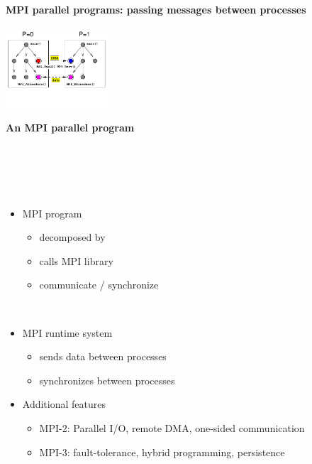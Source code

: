 \begin{frame}[fragile,label=ss-charm] 
\secframetitle{\ssCharm}
\framesubtitle{MPI parallel programs: passing messages between processes}
\begin{minipage}[t]{1.75in}
\begin{center}
\begin{minipage}{1.50in}
\includegraphics[width=1.50in]{mpi.pdf}\\
\vspace{-0.5in}
\centerline{\scriptsize\textbf{An MPI parallel program}}
\end{minipage}\\ \ \\
\end{center}
\end{minipage} \ 
\begin{minipage}[t]{2.50in}
\vspace{-0.6in}
\begin{itemize}
\item MPI program
  \begin{itemize}
  \item decomposed by 
  \item calls MPI library
  \item communicate / synchronize
  \end{itemize}
\ \\ \pause
\item MPI runtime system
  \begin{itemize}
  \item sends data between processes
  \item synchronizes between processes
  \end{itemize} \pause
\item Additional features
\begin{itemize}
\item MPI-2: Parallel I/O, remote DMA,
one-sided communication
\item MPI-3: fault-tolerance, hybrid programming, persistence
\end{itemize}
\end{itemize}
\end{minipage}
\end{frame}
